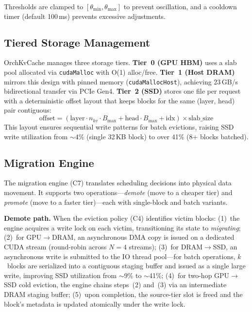 \documentclass[conference]{IEEEtran}
\begin{document}
Thresholds are clamped to $[\theta_{\min}, \theta_{\max}]$ to prevent oscillation, and a cooldown timer (default 100\,ms) prevents excessive adjustments.

\subsection{Tiered Storage Management}
\label{sec:tiered-storage}

OrchKvCache manages three storage tiers.
\textbf{Tier~0 (GPU HBM)} uses a slab pool allocated via \texttt{cudaMalloc} with O(1) alloc/free.
\textbf{Tier~1 (Host DRAM)} mirrors this design with pinned memory (\texttt{cudaMallocHost}), achieving 23\,GB/s bidirectional transfer via PCIe Gen4.
\textbf{Tier~2 (SSD)} stores one file per request with a deterministic offset layout that keeps blocks for the same (layer, head) pair contiguous:
\begin{equation}
\text{offset} = (\text{layer} \cdot n_{kv} \cdot B_{\max} + \text{head} \cdot B_{\max} + \text{idx}) \times \text{slab\_size}
\end{equation}
This layout ensures sequential write patterns for batch evictions, raising SSD write utilization from ${\sim}$4\% (single 32\,KB block) to over 41\% (8+ blocks batched).

\subsection{Migration Engine}

The migration engine (C7) translates scheduling decisions into physical data movement. It supports two operations---\emph{demote} (move to a cheaper tier) and \emph{promote} (move to a faster tier)---each with single-block and batch variants.

\textbf{Demote path.} When the eviction policy (C4) identifies victim blocks:
(1)~the engine acquires a write lock on each victim, transitioning its state to \emph{migrating};
(2)~for GPU$\to$DRAM, an asynchronous DMA copy is issued on a dedicated CUDA stream (round-robin across $N{=}4$ streams);
(3)~for DRAM$\to$SSD, an asynchronous write is submitted to the IO thread pool---for batch operations, $k$~blocks are serialized into a contiguous staging buffer and issued as a single large write, improving SSD utilization from ${\sim}$9\% to ${\sim}$41\%;
(4)~for two-hop GPU$\to$SSD cold eviction, the engine chains steps~(2) and~(3) via an intermediate DRAM staging buffer;
(5)~upon completion, the source-tier slot is freed and the block's metadata is updated atomically under the write lock.
\end{document}
